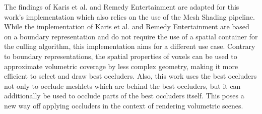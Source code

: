 \noindent
The findings of Karis et al. and Remedy Entertainment are adapted for this work's implementation which also relies on 
the use of the Mesh Shading pipeline. While the implementation of Karis et al. and Remedy Entertainment are based on 
a boundary representation and do not require the use of a spatial container for the culling algorithm, this 
implementation aims for a different use case. Contrary to boundary representations, the spatial properties of voxels 
can be used to approximate volumetric coverage by less complex geometry, making it more efficient to select and draw 
best occluders. Also, this work uses the best occluders not only to occlude meshlets which are behind the best occluders, 
but it can additionally be used to occlude parts of the best occluders itself. This poses a new way off applying occluders 
in the context of rendering volumetric scenes.


